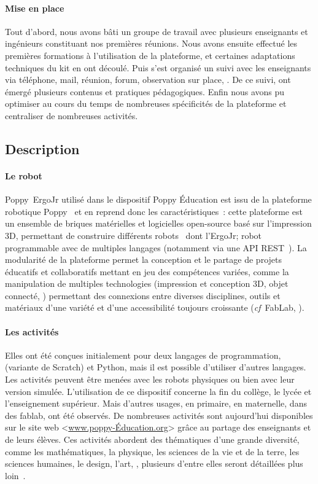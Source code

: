     \paragraph{Mise  en place}
        Tout d'abord, nous avons bâti un groupe de travail avec plusieurs enseignants et ingénieurs constituant nos premières réunions.
        Nous avons ensuite effectué les premières formations à l'utilisation de la plateforme, et certaines adaptations techniques du kit en ont découlé.
        Puis s'est organisé un suivi avec les enseignants via téléphone, mail, réunion, forum, observation sur place, \etc.
        De ce suivi, ont émergé plusieurs contenus et pratiques pédagogiques.
        Enfin nous avons pu optimiser au cours du temps de nombreuses spécificités de la plateforme et centraliser de nombreuses activités.
    \subsection{Description}    
        \paragraph{Le robot}
            Poppy~ErgoJr utilisé dans le dispositif Poppy Éducation est issu de la plateforme robotique Poppy~ et en reprend donc les caractéristiques~: cette plateforme est un ensemble de briques matérielles et logicielles open-source basé sur l’impression 3D, permettant de construire différents robots~ dont l’ErgoJr; robot programmable avec de multiples langages (notamment via une API REST~).
            La modularité de la plateforme permet la conception et le partage de projets éducatifs et collaboratifs mettant en jeu des compétences variées, comme la manipulation de multiples technologies (\eg impression et conception 3D, objet connecté, \etc) permettant des connexions entre diverses disciplines, outils et matériaux d'une variété et d'une accessibilité toujours croissante (\textit{cf}~FabLab, ).
        \paragraph{Les activités}
            Elles ont été conçues initialement pour deux langages de programmation,  (variante de Scratch) et Python, mais il est possible d’utiliser d’autres langages.
            Les activités peuvent être menées avec les robots physiques ou bien avec leur version simulée.
            L’utilisation de ce dispositif concerne la fin du collège, le lycée et l’enseignement supérieur.
            Mais d'autres usages, en primaire, en maternelle, dans des fablab, ont été observés.
            De nombreuses activités sont aujourd'hui disponibles sur le site web <\url{www.poppy-Éducation.org}> grâce au partage des enseignants et de leurs élèves.
            Ces activités abordent des thématiques d'une grande diversité, comme les mathématiques, la physique, les sciences de la vie et de la terre, les sciences humaines, le design, l'art, \etc, plusieurs d'entre elles seront détaillées plus loin~.
